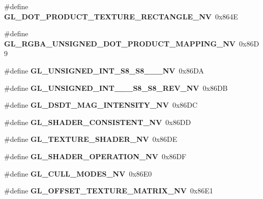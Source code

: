 \begin{DoxyCompactItemize}
\item 
\#define {\bfseries G\+L\+\_\+\+D\+O\+T\+\_\+\+P\+R\+O\+D\+U\+C\+T\+\_\+\+T\+E\+X\+T\+U\+R\+E\+\_\+\+R\+E\+C\+T\+A\+N\+G\+L\+E\+\_\+\+N\+V}~0x864\+E\label{_s_d_l__opengl_8h_a7f4e9bad02b762f4c44a09f93192fc69}

\item 
\#define {\bfseries G\+L\+\_\+\+R\+G\+B\+A\+\_\+\+U\+N\+S\+I\+G\+N\+E\+D\+\_\+\+D\+O\+T\+\_\+\+P\+R\+O\+D\+U\+C\+T\+\_\+\+M\+A\+P\+P\+I\+N\+G\+\_\+\+N\+V}~0x86\+D9\label{_s_d_l__opengl_8h_a94f3d9da7c7f0c17fd77b9e09ed5f0f1}

\item 
\#define {\bfseries G\+L\+\_\+\+U\+N\+S\+I\+G\+N\+E\+D\+\_\+\+I\+N\+T\+\_\+\+S8\+\_\+\+S8\+\_\+\_\+\_\+\+N\+V}~0x86\+D\+A\label{_s_d_l__opengl_8h_ab85dc7d9ed9ea2fd61dab55aac99137f}

\item 
\#define {\bfseries G\+L\+\_\+\+U\+N\+S\+I\+G\+N\+E\+D\+\_\+\+I\+N\+T\+\_\+\_\+\_\+\+S8\+\_\+\+S8\+\_\+\+R\+E\+V\+\_\+\+N\+V}~0x86\+D\+B\label{_s_d_l__opengl_8h_a80d1b8049578225925adee6114e0ff1f}

\item 
\#define {\bfseries G\+L\+\_\+\+D\+S\+D\+T\+\_\+\+M\+A\+G\+\_\+\+I\+N\+T\+E\+N\+S\+I\+T\+Y\+\_\+\+N\+V}~0x86\+D\+C\label{_s_d_l__opengl_8h_a4ee6f5fea554ca6bdd4c64cc212633a6}

\item 
\#define {\bfseries G\+L\+\_\+\+S\+H\+A\+D\+E\+R\+\_\+\+C\+O\+N\+S\+I\+S\+T\+E\+N\+T\+\_\+\+N\+V}~0x86\+D\+D\label{_s_d_l__opengl_8h_a057a82389278a1d89e69858e8e22dcfa}

\item 
\#define {\bfseries G\+L\+\_\+\+T\+E\+X\+T\+U\+R\+E\+\_\+\+S\+H\+A\+D\+E\+R\+\_\+\+N\+V}~0x86\+D\+E\label{_s_d_l__opengl_8h_a53dd4e08237db42007aafcc639c83b33}

\item 
\#define {\bfseries G\+L\+\_\+\+S\+H\+A\+D\+E\+R\+\_\+\+O\+P\+E\+R\+A\+T\+I\+O\+N\+\_\+\+N\+V}~0x86\+D\+F\label{_s_d_l__opengl_8h_ae6e250a9d3b57ca1c7c3feade2f28899}

\item 
\#define {\bfseries G\+L\+\_\+\+C\+U\+L\+L\+\_\+\+M\+O\+D\+E\+S\+\_\+\+N\+V}~0x86\+E0\label{_s_d_l__opengl_8h_abe95e67754b4eb6a33d3303dcdea7814}

\item 
\#define {\bfseries G\+L\+\_\+\+O\+F\+F\+S\+E\+T\+\_\+\+T\+E\+X\+T\+U\+R\+E\+\_\+\+M\+A\+T\+R\+I\+X\+\_\+\+N\+V}~0x86\+E1\label{_s_d_l__opengl_8h_a4ef75b7d70365dc490a4cd3e5e6d979a}


\end{DoxyCompactItemize}
